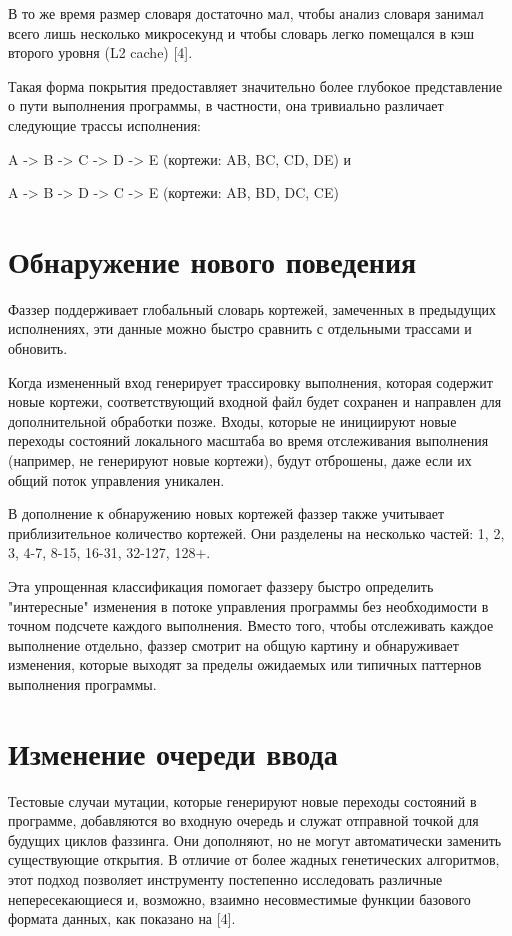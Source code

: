В то же время размер словаря достаточно мал, чтобы анализ словаря занимал всего лишь несколько микросекунд и чтобы словарь легко помещался в кэш второго уровня (L2 cache) [4].
\par
Такая форма покрытия предоставляет значительно более глубокое представление о пути выполнения программы, в частности, она тривиально различает следующие трассы исполнения:
\par
A -> B -> C -> D -> E (кортежи: AB, BC, CD, DE) и 
\par
A -> B -> D -> C -> E (кортежи: AB, BD, DC, CE)

\section{Обнаружение нового поведения} \label{ch3:sec3}
Фаззер поддерживает глобальный словарь кортежей, замеченных в предыдущих исполнениях, эти данные можно быстро сравнить с отдельными трассами и обновить.
\par
Когда измененный вход генерирует трассировку выполнения, которая содержит новые кортежи, соответствующий входной файл будет сохранен и направлен для дополнительной обработки позже. Входы, которые не инициируют новые переходы состояний локального масштаба во время отслеживания выполнения (например, не генерируют новые кортежи), будут отброшены, даже если их общий поток управления уникален.
\par
В дополнение к обнаружению новых кортежей фаззер также учитывает приблизительное количество кортежей. Они разделены на несколько частей:
1, 2, 3, 4-7, 8-15, 16-31, 32-127, 128+.
\par
Эта упрощенная классификация помогает фаззеру быстро определить "интересные" изменения в потоке управления программы без необходимости в точном подсчете каждого выполнения. Вместо того, чтобы отслеживать каждое выполнение отдельно, фаззер смотрит на общую картину и обнаруживает изменения, которые выходят за пределы ожидаемых или типичных паттернов выполнения программы.
\section{Изменение очереди ввода} \label{ch3:sec4}
Тестовые случаи мутации, которые генерируют новые переходы состояний в программе, добавляются во входную очередь и служат отправной точкой для будущих циклов фаззинга. Они дополняют, но не могут автоматически заменить существующие открытия.
В отличие от более жадных генетических алгоритмов, этот подход позволяет инструменту постепенно исследовать различные непересекающиеся и, возможно, взаимно несовместимые функции базового формата данных, как показано на  [4].


